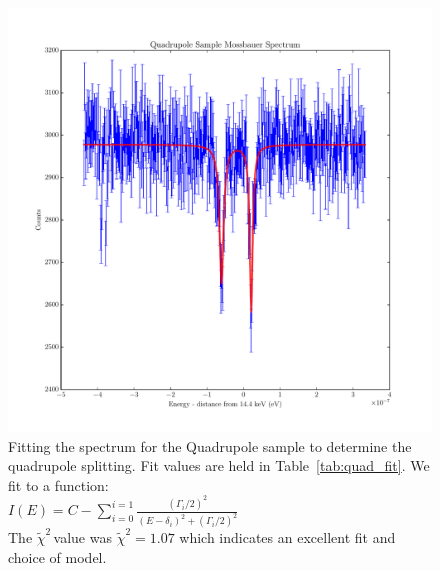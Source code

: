 \documentclass[reprint, nobibnotes, amssymb, amsmath, amsfonts, mathtools, mathrsfs, floatfix]{revtex4-1}
\newcommand{\redchi}{$\tilde{\chi}^2\,$}
\begin{document}
\begin{widetext}
      \begin{figure}[h]
        \centering
        \includegraphics[width=\linewidth]{../plots/quadrupole.pdf}
        \caption{Fitting the spectrum for the Quadrupole sample to determine the quadrupole splitting.  Fit values are held in Table~\ref{tab:quad_fit}.  We fit to a function: \\
          $I(E) = C - \sum\limits_{i = 0}^{i = 1}{ \frac{(\Gamma_i/2)^2}{(E-\delta_i)^2 + (\Gamma_i/2)^2} }$ \\
        The \redchi value was $\tilde{\chi}^2 = 1.07$ which indicates an excellent fit and choice of model.~\label{quadrupole_fit}}
      \end{figure}

    \end{widetext}

    
    
\end{document}
